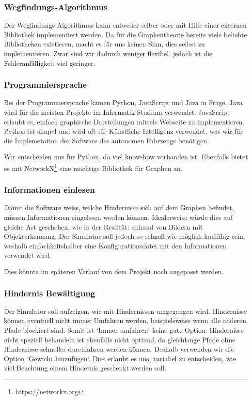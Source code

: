 \documentclass[../main.tex]{subfiles}
\begin{document}
\subsubsection{Wegfindungs-Algorithmus}

Der Wegfindungs-Algorithmus kann entweder selber oder mit Hilfe einer externen Bibliothek 
implementiert werden. Da für die Graphentheorie bereits viele beliebte Bibliotheken existieren, macht es für uns keinen Sinn, dies selbst zu implementieren. Zwar sind wir dadurch weniger flexibel, jedoch ist die Fehleranfälligkeit viel geringer.  

\subsubsection{Programmiersprache}

Bei der Programmiersprache kamen Python, JavaScript und Java in Frage.
Java wird für die meisten Projekte im Informatik-Studium verwendet. JavaScript erlaubt es, einfach graphische Darstellungen mittels Webseite zu implementieren. Python ist simpel und wird oft für Künstliche Intelligenz verwendet, was wir für die Implemetation der Software des autonomen Fahrzeugs benötigen. 

Wir entscheiden uns für Python, da viel know-how vorhanden ist. Ebenfalls bietet es mit NetworkX\footnote{https://networkx.org} eine mächtige Bibliothek für Graphen an.

\subsubsection{Informationen einlesen}

Damit die Software weiss, welche Hindernisse sich auf dem Graphen befindet, müssen Informationen eingelesen werden können. Idealerweise würde dies auf gleiche Art geschehen, wie in der Realität: anhand von Bildern mit Objekterkennung. Der Simulator soll jedoch so schnell wie möglich lauffähig sein, weshalb einfachkeitshalber eine Konfigurationsdatei mit den Informationen verwendet wird.

Dies könnte im späteren Verlauf von dem Projekt noch angepasst werden.

\subsubsection{Hindernis Bewältigung}

Der Simulator soll aufzeigen, wie mit Hindernissen umgegangen wird.
Hindernisse können eventuell nicht immer Umfahren werden, beispielsweise wenn alle anderen Pfade blockiert sind. Somit ist `Immer umfahren` keine gute Option. Hindernisse nicht speziell behandeln ist ebenfalls nicht optimal, da gleichlange Pfade ohne Hindernisse schneller durchfahren werden können. Deshalb verwenden wir die Option `Gewicht hinzufügen`. Dies erlaubt es uns, variabel zu entscheiden, wie viel Beachtung einem Hindernis geschenkt werden soll.
\end{document}
